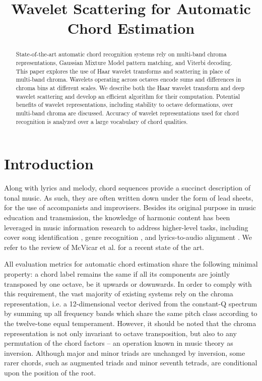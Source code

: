 \documentclass{article}
\title{Wavelet Scattering for Automatic Chord Estimation}
\makeatletter
\newcommand*{\ie}{i.e.\@\xspace}
\newcommand*{\etal}{et al.\@\xspace}
\makeatother
\begin{document}
%
\maketitle
%
\begin{abstract}
State-of-the-art automatic chord recognition systems rely on multi-band chroma representations,
Gaussian Mixture Model pattern matching, and Viterbi decoding.
This paper explores the use of Haar wavelet transforms and scattering in place of multi-band
chroma. Wavelets operating across octaves encode sums and differences in chroma bins at
different scales.
We describe both the Haar wavelet transform and deep wavelet scattering and develop an
efficient algorithm for their computation. Potential benefits of wavelet representations,
including stability to octave deformations, over multi-band chroma are discussed.
Accuracy of wavelet representations used for chord recognition is analyzed over a large
vocabulary of chord qualities.
\end{abstract}

\section{Introduction}\label{sec:introduction}
Along with lyrics and melody, chord sequences provide a succinct description of tonal music.
As such, they are often written down under the form of lead sheets, for the use of
accompanists and improvisers.
Besides its original purpose in music education and transmission, the knowledge of
harmonic content has been leveraged in music information research to address higher-level
tasks, including cover song identification \cite{ellis2007identifying},
genre recognition \cite{perez2009genre}, and lyrics-to-audio alignment
\cite{mauch2012integrating}. We refer to the review of McVicar \etal
\cite{mcvicar2014automatic} for a recent state of the art.

All evaluation metrics for automatic
chord estimation share the following minimal property:
a chord label remains the same if all its components are jointly
transposed by one octave, be it upwards or downwards.
In order to comply with this requirement, the vast majority of existing
systems rely on the chroma representation, \ie a 12-dimensional vector
derived from the constant-Q spectrum by summing up all
frequency bands which share the same pitch class according to
the twelve-tone equal temperament.
However, it should be noted that the chroma representation is not
only invariant to octave transposition, but also to any permutation
of the chord factors -- an operation known in music theory
as inversion.
Although major and minor triads are unchanged by inversion,
some rarer chords, such as augmented triads and minor seventh
tetrads, are conditional upon the position of the root.
\end{document}
